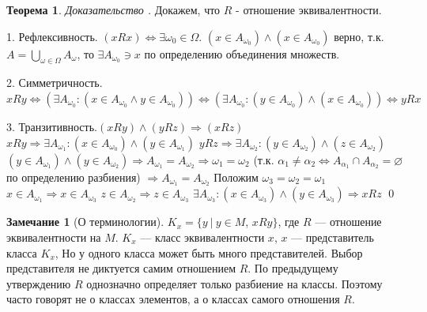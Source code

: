 \documentclass[12pt,oneside]{article}
\theoremstyle{definition}
\newtheorem{theorem}{Теорема}[section]
\newtheorem{remark}{Замечание}[section]
\newenvironment{ourproof}[1]{\textit{Доказательство #1.}}{\qed}
\begin{document}
\begin{theorem}
\begin{ourproof}{}
Докажем, что $R$ - отношение эквивалентности.

    1. Рефлексивность. $(xRx) \Leftrightarrow \exists \omega_0 \in \Omega$.
    \newline
    $(x\in A_{\omega_0})\wedge (x\in A_{\omega_0})$ верно, т.к. $A = \displaystyle\bigcup_{\omega \in \Omega} A_{\omega}$, то $\exists A_{\omega_0}\ni x$ по определению объединения множеств.

    2. Симметричность. $xRy \Leftrightarrow (\exists A_{\omega_0}: (x \in A_{\omega_0} \wedge y\in A_{\omega_0})) \Leftrightarrow (\exists A_{\omega_0}: (y \in A_{\omega_0})\wedge (x\in A_{\omega_0})) \Leftrightarrow yRx$

    3. Транзитивность.$(xRy)\wedge(yRz) \Rightarrow (xRz)$
    \newline
    $xRy \Longrightarrow \exists A_{\omega_1}: (x\in A_{\omega_0})\wedge (y\in A_{\omega_1})$
    \newline
    $yRz \Longrightarrow \exists A_{\omega_2}: (y\in A_{\omega_2})\wedge (z\in A_{\omega_2})$
    \newline
    $(y\in A_{\omega_1})\wedge (y\in A_{\omega_2}) \Longrightarrow A_{\omega_1}=A_{\omega_2} \Longrightarrow \omega_1 = \omega_2$
    \newline
    (т.к. $\alpha_1 \neq \alpha_2 \Leftrightarrow A_{\alpha_1}\cap A_{\alpha_2} = \varnothing$ по определению разбиения) $\Longrightarrow A_{\omega_1} = A_{\omega_2}$
    \newline
    Положим $\omega_3 = \omega_2 = \omega_1$
    \newline
    $x\in A_{\omega_1} \Rightarrow x\in A_{\omega_3}$
    \newline
    $z\in A_{\omega_2} \Rightarrow z\in A_{\omega_3}$
    \newline
    $\exists A_{\omega_3}: (x\in A_{\omega_3})\wedge (y\in A_{\omega_3}) \Rightarrow xRz$
    \end{ourproof}
\end{theorem}
\begin{remark}[О терминологии]
$K_x = \{y\ |\ y\in M$, $xRy\}$, где $R$ --- отношение эквивалентности на $M$.
\newline
$K_x$ --- класс эквивалентности $x$,
\newline
$x$ --- представитель класса $K_x$, 
\newline
Но у одного класса может быть много представителей. Выбор представителя не диктуется самим отношением $R$. По предыдущему утверждению $R$ однозначно определяет только разбиение на классы. Поэтому часто говорят не о классах элементов, а о классах самого отношения $R$.
\end{remark}
\end{document}
